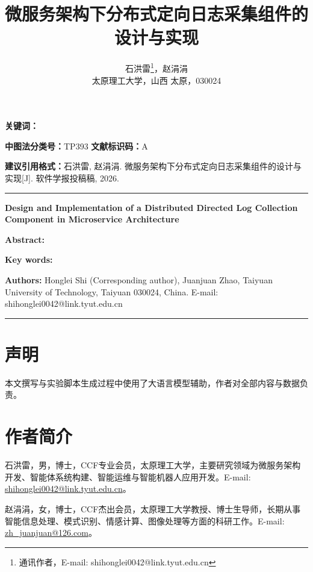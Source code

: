 \documentclass[12pt,a4paper]{ctexart}
\title{微服务架构下分布式定向日志采集组件的设计与实现}
\author{石洪雷\thanks{通讯作者，E-mail: shihonglei0042@link.tyut.edu.cn}，赵涓涓\\
\small 太原理工大学，山西 太原，030024}
\date{}
\begin{document}
\maketitle



\begin{abstract}
\AbstractContentZh
\end{abstract}

\noindent\textbf{关键词：}\KeywordsZh

\noindent\textbf{中图法分类号：}TP393 \quad \textbf{文献标识码：}A

\vspace{0.4em}
\noindent\textbf{建议引用格式：}石洪雷, 赵涓涓. 微服务架构下分布式定向日志采集组件的设计与实现[J]. 软件学报投稿稿, 2026.

\vspace{1em}
\hrule
\vspace{0.8em}

{\centering\bfseries Design and Implementation of a Distributed Directed Log Collection Component in Microservice Architecture\par}
\vspace{0.6em}

\noindent\textbf{Abstract:}
\AbstractContentEn

\vspace{0.5em}
\noindent\textbf{Key words:} \KeywordsEn

\vspace{0.4em}
\noindent\textbf{Authors:} Honglei Shi (Corresponding author), Juanjuan Zhao, Taiyuan University of Technology, Taiyuan 030024, China. E-mail: shihonglei0042@link.tyut.edu.cn

\vspace{1em}
\hrule
\vspace{1em}









\section*{声明}
本文撰写与实验脚本生成过程中使用了大语言模型辅助，作者对全部内容与数据负责。




\section*{作者简介}
石洪雷，男，博士，CCF专业会员，太原理工大学，主要研究领域为微服务架构开发、智能体系统构建、智能运维与智能机器人应用开发。E-mail: \url{shihonglei0042@link.tyut.edu.cn}。

赵涓涓，女，博士，CCF杰出会员，太原理工大学教授、博士生导师，长期从事智能信息处理、模式识别、情感计算、图像处理等方面的科研工作。E-mail: \url{zh_juanjuan@126.com}。
\end{document}
